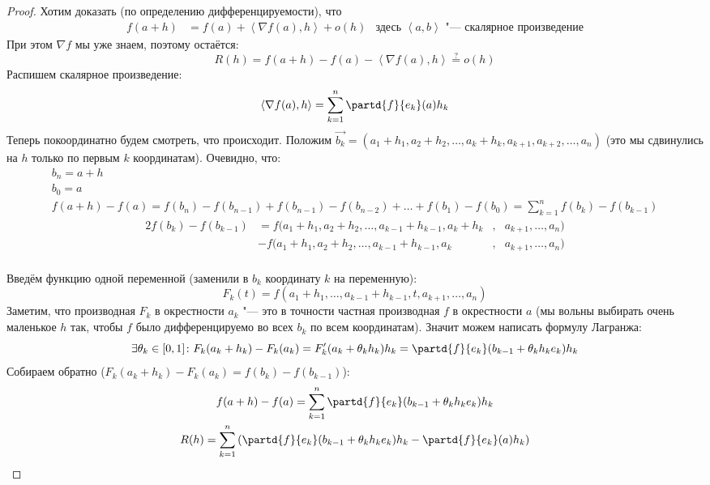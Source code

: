 

\begin{proof}
	Хотим доказать (по определению дифференцируемости), что
	\begin{align*}
	f(a+h)&=f(a)+\left<\nabla f(a), h\right>+o(h) & \text{здесь $\left<a, b\right>$ "--- скалярное произведение}
	\end{align*}
	При этом $\nabla f$ мы уже знаем, поэтому остаётся:
	\[R(h)=f(a+h)-f(a)-\left<\nabla f(a), h\right> \stackrel{?}{=} o(h)\]
	Распишем скалярное произведение:
	\[\left<\nabla f(a), h\right> = \sum_{k=1}^n \partd{f}{e_k}(a) h_k\]
	Теперь покоординатно будем смотреть, что происходит.
	Положим $\vec{b_k} = (a_1+h_1, a_2+h_2, \dots, a_k+h_k, a_{k+1}, a_{k+2}, \dots, a_n)$
	(это мы сдвинулись на $h$ только по первым $k$ координатам).
	Очевидно, что:
	\begin{gather*}
		b_n = a + h \\
		b_0 = a \\
		f(a+h)-f(a)=f(b_n)-f(b_{n-1})+f(b_{n-1})-f(b_{n-2})+\dots+f(b_1)-f(b_0)
		           =\sum_{k=1}^n f(b_k)-f(b_{k-1})
	\end{gather*}
	\begin{alignat*}{2}
		f(b_k) - f(b_{k-1}) &= f(a_1+h_1, a_2+h_2, \dots, a_{k-1}+h_{k-1}, a_k+h_k&,& a_{k+1}, \dots, a_n) \\
		                    &- f(a_1+h_1, a_2+h_2, \dots, a_{k-1}+h_{k-1}, a_k    &,& a_{k+1}, \dots, a_n) \\
	\end{alignat*}

	Введём функцию одной переменной (заменили в $b_k$ координату $k$ на переменную):
	\[ F_k(t) = f(a_1+h_1, \dots, a_{k-1}+h_{k-1}, t, a_{k+1}, \dots, a_n) \]
	Заметим, что производная $F_k$ в окрестности $a_k$ "--- это в точности частная производная $f$ в окрестности $a$
	(мы вольны выбирать очень маленькое $h$ так, чтобы $f$ было дифференцируемо во всех $b_k$ по всем координатам).
	Значит можем написать формулу Лагранжа:
	\[
	\exists \theta_k \in [0, 1] \colon
	F_k(a_k+h_k) - F_k(a_k) = F'_k(a_k+\theta_kh_k)h_k
	                        = \partd{f}{e_k} (b_{k-1}+\theta_k h_k e_k) h_k
	\]
	Собираем обратно ($F_k(a_k+h_k) - F_k(a_k) = f(b_k) - f(b_{k-1})$):
	\begin{gather*}
	f(a+h) - f(a) = \sum_{k=1}^n \partd{f}{e_k} (b_{k-1}+\theta_k h_k e_k) h_k \\
	R(h) = \sum_{k=1}^n \left( \partd{f}{e_k} (b_{k-1}+\theta_k h_k e_k) h_k - \partd{f}{e_k}(a) h_k \right)
	\end{gather*}


\end{proof}
